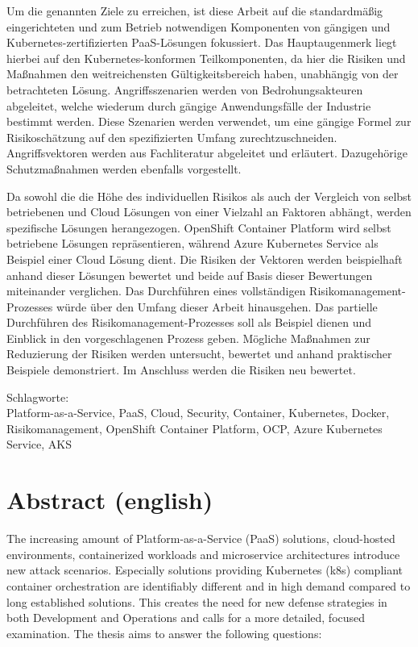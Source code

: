Um die genannten Ziele zu erreichen, ist diese Arbeit auf die standardmäßig eingerichteten und zum Betrieb notwendigen Komponenten von gängigen und Kubernetes-zertifizierten PaaS-Lösungen fokussiert.
Das Hauptaugenmerk liegt hierbei auf den Kubernetes-konformen Teilkomponenten, da hier die Risiken und Maßnahmen den weitreichensten Gültigkeitsbereich haben, unabhängig von der betrachteten Lösung.
Angriffsszenarien werden von Bedrohungsakteuren abgeleitet, welche wiederum durch gängige Anwendungsfälle der Industrie bestimmt werden.
Diese Szenarien werden verwendet, um eine gängige Formel zur Risikoschätzung auf den spezifizierten Umfang zurechtzuschneiden.
Angriffsvektoren werden aus Fachliteratur abgeleitet und erläutert. Dazugehörige Schutzmaßnahmen werden ebenfalls vorgestellt.

Da sowohl die die Höhe des individuellen Risikos als auch der Vergleich von selbst betriebenen und Cloud Lösungen von einer Vielzahl an Faktoren abhängt, werden spezifische Lösungen herangezogen. OpenShift Container Platform wird selbst betriebene Lösungen repräsentieren, während Azure Kubernetes Service als Beispiel einer Cloud Lösung dient.
Die Risiken der Vektoren werden beispielhaft anhand dieser Lösungen bewertet und beide auf Basis dieser Bewertungen miteinander verglichen.
Das Durchführen eines vollständigen Risikomanagement-Prozesses würde über den Umfang dieser Arbeit hinausgehen.
Das partielle Durchführen des Risikomanagement-Prozesses soll als Beispiel dienen und Einblick in den vorgeschlagenen Prozess geben.
Mögliche Maßnahmen zur Reduzierung der Risiken werden untersucht, bewertet und anhand praktischer Beispiele demonstriert.
Im Anschluss werden die Risiken neu bewertet.


\bigskip

\noindent
Schlagworte: \\
Platform-as-a-Service, PaaS, Cloud, Security, Container, Kubernetes, Docker, Risikomanagement, OpenShift Container Platform, OCP, Azure Kubernetes Service, AKS


\chapter*{Abstract (english)}
\thispagestyle{empty}

The increasing amount of Platform-as-a-Service (PaaS) solutions, cloud-hosted environments, containerized workloads and microservice architectures introduce new attack scenarios. 
Especially solutions providing Kubernetes (k8s) compliant container orchestration are identifiably different and in high demand compared to long established solutions. 
This creates the need for new defense strategies in both Development and Operations and calls for a more detailed, focused examination. 
The thesis aims to answer the following questions:

